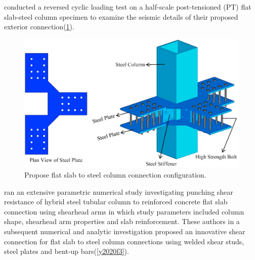 \documentclass[twocolumn]{article} %
\begin{document}
\cite{rafiee2021} conducted a reversed cyclic loading test on a half-scale post-tensioned (PT) flat slab-steel column specimen to examine the seismic details of their proposed exterior connection(\ref{r2021f2}).
\begin{figure}\centering
    \includegraphics[width=\columnwidth]{Figures/r2021f2.png}
    \caption{Propose flat slab to steel column connection configuration\citep{rafiee2021}.}
    \label{r2021f2}
    \end{figure}
\cite{yan2016} ran an extensive parametric numerical study investigating punching shear resistance of hybrid steel tubular column to reinforced concrete flat slab connection using shearhead arms in which study parameters included column shape, shearhead arm properties and slab reinforcement. These authors in a subsequent numerical and analytic investigation\citep{yu2020} proposed an innovative shear connection for flat slab to steel column connections using welded shear studs, steel plates and bent-up bars(\ref{y2020f3}). 
\end{document}
